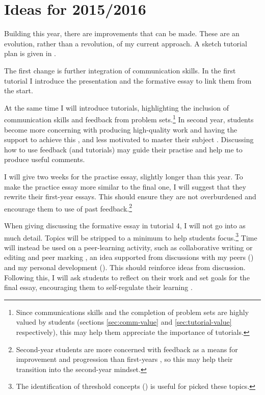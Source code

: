 \section{Ideas for 2015/2016}\label{sec:future}

Building this year, there are improvements that can be made. These are an evolution, rather than a revolution, of my current approach. A sketch tutorial plan is given in .

The first change is further integration of communication skills. In the first tutorial I introduce the presentation and the formative essay to link them from the start.

At the same time I will introduce tutorials, highlighting the inclusion of communication skills and feedback from problem sets.\footnote{Since communications skills and the completion of problem sets are highly valued by students (sections \ref{sec:comm-value} and \ref{sec:tutorial-value} respectively), this may help them appreciate the importance of tutorials.} In second year, students become more concerning with producing high-quality work and having the support to achieve this \citep{Zaitseva2013}, and less motivated to master their subject \citep{Lieberman2007}. Discussing how to use feedback (and tutorials) may guide their practise and help me to produce useful comments.

I will give two weeks for the practise essay, slightly longer than this year. To make the practice essay more similar to the final one, I will suggest that they rewrite their first-year essays. This should ensure they are not overburdened and encourage them to use of past feedback.\footnote{Second-year students are more concerned with feedback as a means for improvement and progression than first-years \citep{Zaitseva2013}, so this may help their transition into the second-year mindset.}

When giving discussing the formative essay in tutorial 4, I will not go into as much detail. Topics will be stripped to a minimum to help students focus.\footnote{The identification of threshold concepts () is useful for picked these topics.} Time will instead be used on a peer-learning activity, such as collaborative writing or editing and peer marking \citep[chapter 1]{Falchikov2001}, an idea supported from discussions with my peers () and my personal development (). This should reinforce ideas from discussion. Following this, I will ask students to reflect on their work and set goals for the final essay, encouraging them to self-regulate their learning \citep{Nicol2006}.

